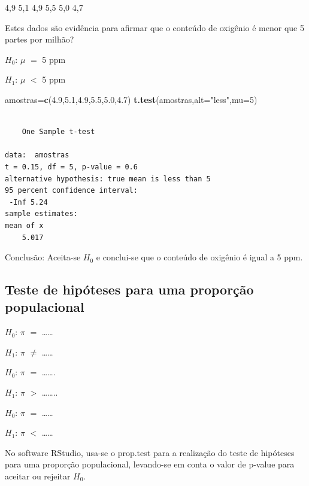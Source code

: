 \documentclass[12pt,brazil,oneside]{book}
\newenvironment{Shaded}{\begin{snugshade}}{\end{snugshade}}
\newcommand{\DataTypeTok}[1]{\textcolor[rgb]{0.13,0.29,0.53}{#1}}
\newcommand{\DecValTok}[1]{\textcolor[rgb]{0.00,0.00,0.81}{#1}}
\newcommand{\FloatTok}[1]{\textcolor[rgb]{0.00,0.00,0.81}{#1}}
\newcommand{\KeywordTok}[1]{\textcolor[rgb]{0.13,0.29,0.53}{\textbf{#1}}}
\newcommand{\NormalTok}[1]{#1}
\newcommand{\StringTok}[1]{\textcolor[rgb]{0.31,0.60,0.02}{#1}}
\begin{document}
4,9 5,1 4,9 5,5 5,0 4,7

Estes dados são evidência para afirmar que o conteúdo de oxigênio é menor que 5 partes por milhão?

\textbf{\(H_0\)}: \(\mu\) \(=\) 5 ppm

\textbf{\(H_1\)}: \(\mu\) \(<\) 5 ppm

\begin{Shaded}
\begin{Highlighting}[]
\NormalTok{amostras=}\KeywordTok{c}\NormalTok{(}\FloatTok{4.9}\NormalTok{,}\FloatTok{5.1}\NormalTok{,}\FloatTok{4.9}\NormalTok{,}\FloatTok{5.5}\NormalTok{,}\FloatTok{5.0}\NormalTok{,}\FloatTok{4.7}\NormalTok{)}
\KeywordTok{t.test}\NormalTok{(amostras,}\DataTypeTok{alt=}\StringTok{"less"}\NormalTok{,}\DataTypeTok{mu=}\DecValTok{5}\NormalTok{)}
\end{Highlighting}
\end{Shaded}

\begin{verbatim}

    One Sample t-test

data:  amostras
t = 0.15, df = 5, p-value = 0.6
alternative hypothesis: true mean is less than 5
95 percent confidence interval:
 -Inf 5.24
sample estimates:
mean of x 
    5.017 
\end{verbatim}

Conclusão: Aceita-se \(H_0\) e conclui-se que o conteúdo de oxigênio é igual a 5 ppm.

\hypertarget{teste-de-hipoteses-para-uma-proporcao-populacional}{%
\subsection{Teste de hipóteses para uma proporção populacional}\label{teste-de-hipoteses-para-uma-proporcao-populacional}}

\(H_0\): \(\pi\) \(=\) \ldots{}\ldots{}

\(H_1\): \(\pi\) \(\neq\) \ldots{}\ldots{}

\(H_0\): \(\pi\) \(=\) \ldots{}\ldots{}.

\(H_1\): \(\pi\) \(>\) \ldots{}\ldots{}..

\(H_0\): \(\pi\) \(=\) \ldots{}\ldots{}

\(H_1\): \(\pi\) \(<\) \ldots{}\ldots{}

No software RStudio, usa-se o prop.test para a realização do teste de hipóteses para uma proporção populacional, levando-se em conta o valor de p-value para aceitar ou rejeitar \(H_0\).
\end{document}
